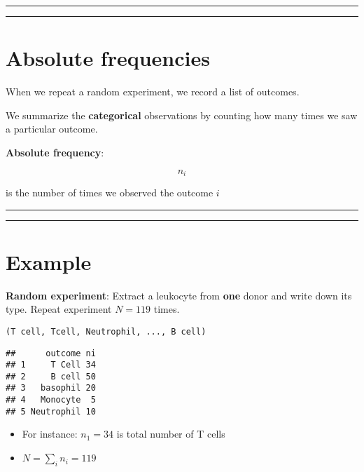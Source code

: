 \documentclass[
]{book}
\providecommand{\tightlist}{%
  \setlength{\itemsep}{0pt}\setlength{\parskip}{0pt}}
\begin{document}
\begin{center}\rule{0.5\linewidth}{0.5pt}\end{center}

\begin{center}\rule{0.5\linewidth}{0.5pt}\end{center}

\hypertarget{absolute-frequencies}{%
\section{Absolute frequencies}\label{absolute-frequencies}}

When we repeat a random experiment, we record a list of outcomes.

We summarize the \textbf{categorical} observations by counting how many times we saw a particular outcome.

\textbf{Absolute frequency}:

\[n_i\]

is the number of times we observed the outcome \(i\)

\begin{center}\rule{0.5\linewidth}{0.5pt}\end{center}

\begin{center}\rule{0.5\linewidth}{0.5pt}\end{center}

\hypertarget{example}{%
\section{Example}\label{example}}

\textbf{Random experiment}: Extract a leukocyte from \textbf{one} donor and write down its type. Repeat experiment \(N=119\) times.

\begin{verbatim}
(T cell, Tcell, Neutrophil, ..., B cell)
\end{verbatim}

\begin{verbatim}
##      outcome ni
## 1     T Cell 34
## 2     B cell 50
## 3   basophil 20
## 4   Monocyte  5
## 5 Neutrophil 10
\end{verbatim}

\begin{itemize}
\tightlist
\item
  For instance: \(n_1=34\) is total number of T cells
\item
  \(N=\sum_i n_i=119\)
\end{itemize}
\end{document}
